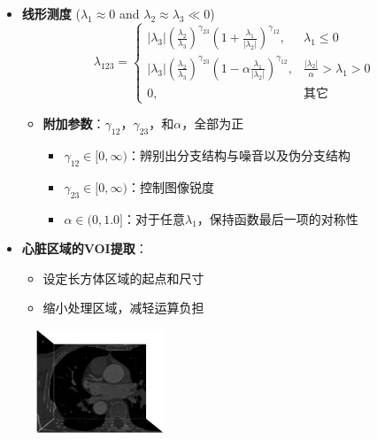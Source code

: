 \begin{frame}
\begin{itemize}
\item \textbf{线形测度} (\alert{$\lambda_1 \approx 0$ and $\lambda_2 \approx \lambda_3 \ll 0$})
\pause \begin{equation*}
\lambda_{123} =
\begin{cases}
\left| \lambda_3 \right| \left( \frac{\lambda_2}{\lambda_3} \right)^{\gamma_{23}} \left( 1 + \frac{\lambda_1}{\left| \lambda_2 \right|} \right)^{\gamma_{12}},        & \lambda_1 \le 0 \\%
\left| \lambda_3 \right| \left( \frac{\lambda_2}{\lambda_3} \right)^{\gamma_{23}} \left( 1 - \alpha \frac{\lambda_1}{\left| \lambda_2 \right|} \right)^{\gamma_{12}}, & \frac{\left| \lambda_2 \right|}{\alpha} > \lambda_1 > 0 \\%
0,                                                                                                                                                                    & \text{其它} %
\end{cases}
\end{equation*}
\begin{itemize}
\pause \item \textbf{附加参数}：$\gamma_{12}$，$\gamma_{23}$，和$\alpha$，全部为正
\begin{itemize}
\item $\gamma_{12} \in [0, \infty)$：辨别出分支结构与噪音以及伪分支结构
\item $\gamma_{23} \in [0, \infty)$：控制图像锐度
\item $\alpha \in (0, 1.0]$：对于任意$\lambda_1$，保持函数最后一项的对称性
\end{itemize}
\end{itemize}
\end{itemize}
\end{frame}

\begin{frame}
\begin{itemize}
  \item \textbf{心脏区域的VOI提取}：
  \begin{itemize}
  \pause \item 设定长方体区域的起点和尺寸
  \pause \item 缩小处理区域，减轻运算负担
  \end{itemize}
\end{itemize}
\begin{figure}[t]
\centering
\includegraphics[width=1.5in]{../../Figures/coronary/coronary_enhanced/original}
\end{figure}
\end{frame}

